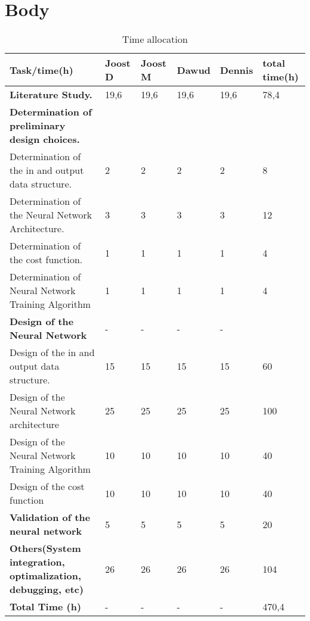 \section{Body}



\begin{sidewaystable}[h!]
	\centering
	\caption{Time allocation}
	\label{tab:timeallocation}
	\begin{tabular}{|l|llll|l|} \hline
		Task/time(h)                                               & Joost D & Joost M & Dawud & Dennis & total time(h) \\ \hline
		\textbf{Literature Study.}                                           & 19,6    & 19,6    & 19,6  & 19,6   & 78,4          \\
		\textbf{Determination of preliminary design choices.}               &         &         &       &        &               \\
		Determination of the in and output data structure.         & 2       & 2       & 2     & 2      & 8             \\
		Determination of the Neural Network Architecture.          & 3       & 3       & 3     & 3      & 12            \\
		Determination of the cost function.                        & 1       & 1       & 1     & 1      & 4             \\
		Determination of Neural Network Training Algorithm         & 1       & 1       & 1     & 1      & 4             \\
		\textbf{Design of the Neural Network}                      &     -    &  -       &    -   & - 		    &               \\
		Design of the in and output data structure.                & 15      & 15      & 15    & 15     & 60            \\
		Design of the Neural Network architecture                  & 25      & 25      & 25    & 25     & 100           \\
		Design of the Neural Network Training Algorithm            & 10      & 10      & 10    & 10     & 40            \\
		Design of the cost function                                & 10      & 10      & 10    & 10     & 40            \\
		\textbf{Validation of the neural network}                  & 5       & 5       & 5     & 5      & 20            \\
		\textbf{Others(System integration, optimalization, debugging, etc)} & 26      & 26      & 26    & 26     & 104           \\
		\textbf{Total Time (h)}                                              &   -      &    -     &   -    &   -     & 470,4       \\ \hline
	\end{tabular}
\end{sidewaystable}